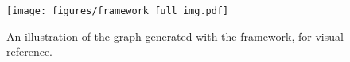 \begin{figure}[ht]
    \centering
    \texttt{[image: figures/framework\_full\_img.pdf]}
    \caption{An illustration of the graph generated with the framework, for visual reference.}
    \label{fig_framework_graph}
\end{figure}